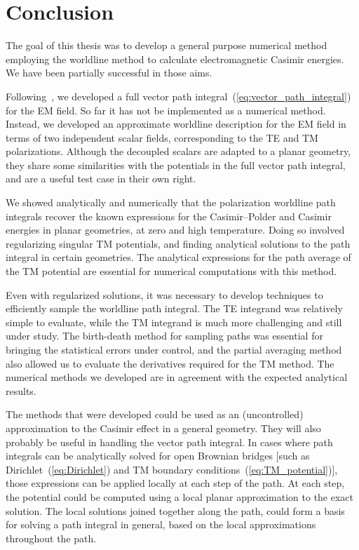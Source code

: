 \chapter{Conclusion}

The goal of this thesis was to develop a general purpose numerical method
employing the worldline method to calculate electromagnetic Casimir energies. 
We have been partially successful in those aims.   %

Following~\citet{Bordag1998,Bordag1999}, we developed a full vector path integral~(\ref{eq:vector_path_integral}) for
the EM field.  So far it has not be implemented as a numerical method.
Instead, we developed an approximate worldline description for the EM field in terms of two independent scalar fields, corresponding 
to the TE and TM polarizations.   
Although the decoupled scalars are adapted to a planar geometry, 
they share some similarities with the potentials in the full vector
path integral, and are a useful test case in their own right.  

We showed analytically and numerically that the polarization worldline path integrals recover the known expressions for the 
Casimir--Polder and Casimir energies in planar geometries, at zero and high temperature.  
Doing so involved regularizing singular TM potentials, and finding analytical solutions to the path integral
in certain geometries.  The analytical expressions for the path average of the TM potential are 
 essential for numerical computations with this method.  

Even with regularized solutions, it was necessary to develop techniques to efficiently
sample the worldline path integral.  The TE integrand was relatively simple to evaluate, while the TM
integrand is much more challenging and still under study.
The birth-death method for sampling paths was essential for bringing the statistical errors under control, 
and the partial averaging method also allowed us to evaluate the derivatives required for the TM method.
The numerical methods we developed are in agreement with the expected analytical results.

The methods that were developed could be used as an (uncontrolled) approximation to the Casimir effect in a general geometry.
They will also probably be useful in handling the vector path integral.    
In cases where path integrals can be analytically solved for open Brownian bridges [such as
Dirichlet~(\ref{eq:Dirichlet}) and TM boundary conditions~(\ref{eq:TM_potential})], 
those expressions can be applied locally at each step of the path.  
At each step, the potential could be computed using a local planar approximation to the exact solution.
The local solutions joined together along the path, could form a basis for solving a path integral
in general, based on the local approximations throughout the path.  

